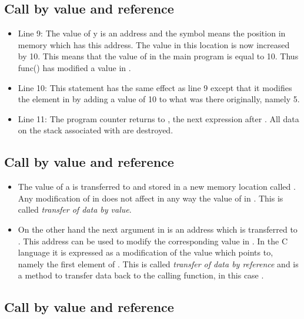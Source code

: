 \documentclass[%
twoside,                 %
final,                   %
10pt]{article}
\begin{document}
{{{{{\noindent
\subsection{Call by value and reference}

\begin{itemize}
  \item Line 9: The value of y is an address and the symbol  means the position in memory which has this address. The value in this location is now increased by 10. This means that the value of  in the main program is equal to 10. Thus func() has modified a value in .

  \item Line 10: This statement has the same effect as line 9 except that it modifies the element  in  by adding a value of 10 to what was there originally, namely 5.

  \item Line 11: The program counter returns to , the next expression after . All data on the stack associated with  are destroyed.
\end{itemize}

\noindent
\subsection{Call by value and reference}

\begin{itemize}
  \item The value of a is transferred to  and stored in a new memory location called . Any modification of  in  does not affect in any way the value of  in . This is called \emph{transfer of data by value}.

  \item On the other hand the next argument in  is an address which is transferred to . This address can be used to modify the corresponding value in . In the C language it is expressed as a modification of the value which  points to, namely the first element of . This is called \emph{transfer of data by reference} and is a method to transfer data back to the calling function, in this case .
\end{itemize}

\noindent
\subsection{Call by value and reference}

}}}}}
\end{document}
